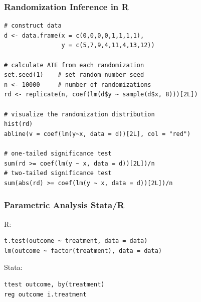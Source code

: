 \documentclass[14pt]{beamer} %
\begin{document}



\begin{frame}[fragile]

\frametitle{Randomization Inference in R}

\footnotesize

\begin{verbatim}
# construct data
d <- data.frame(x = c(0,0,0,0,1,1,1,1), 
                y = c(5,7,9,4,11,4,13,12))

# calculate ATE from each randomization
set.seed(1)    # set random number seed
n <- 10000     # number of randomizations
rd <- replicate(n, coef(lm(d$y ~ sample(d$x, 8)))[2L])

# visualize the randomization distribution
hist(rd)
abline(v = coef(lm(y~x, data = d))[2L], col = "red")

# one-tailed significance test
sum(rd >= coef(lm(y ~ x, data = d))[2L])/n
# two-tailed significance test
sum(abs(rd) >= coef(lm(y ~ x, data = d))[2L])/n
\end{verbatim}

\end{frame}


\begin{frame}[fragile]

\frametitle{Parametric Analysis Stata/R}

R:\small
\begin{verbatim}
t.test(outcome ~ treatment, data = data)
lm(outcome ~ factor(treatment), data = data)
\end{verbatim}

\vspace{1em}

Stata:\small
\begin{verbatim}
ttest outcome, by(treatment)
reg outcome i.treatment
\end{verbatim}

\end{frame}




\appendix
\frame{}
\end{document}
